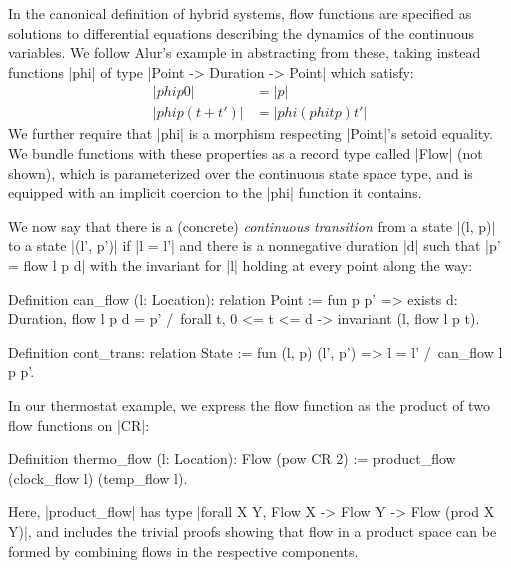 \documentclass[runningheads]{llncs}
\begin{document}

In the canonical definition of hybrid systems, flow functions are specified as solutions to differential equations describing the dynamics of the continuous variables. We follow Alur's example in abstracting from these, taking instead functions |phi| of type |Point -> Duration -> Point| which satisfy:
\begin{align*}
  |phi p 0| &= |p| \\
  |phi p (t + t')| &= |phi (phi t p) t'|
\end{align*}
We further require that |phi| is a morphism respecting |Point|'s setoid equality. We bundle functions with these properties as a record type called |Flow| (not shown), which is parameterized over the continuous state space type, and is equipped with an implicit coercion to the |phi| function it contains.


We now say that there is a (concrete) \emph{continuous transition} from a state |(l, p)| to a state |(l', p')| if |l = l'| and there is a nonnegative duration |d| such that |p' = flow l p d| with the invariant for |l| holding at every point along the way:

\begin{code}
  Definition can_flow (l: Location): relation Point
    := fun p p' => exists d: Duration, flow l p d = p' /\
      forall t, 0 <= t <= d -> invariant (l, flow l p t).

  Definition cont_trans: relation State
    := fun (l, p) (l', p') => l = l' /\ can_flow l p p'.
\end{code}

In our thermostat example, we express the flow function as the product of two flow functions on |CR|:

\begin{code}
  Definition thermo_flow (l: Location): Flow (pow CR 2)
    := product_flow (clock_flow l) (temp_flow l).
\end{code}
Here, |product_flow| has type |forall X Y, Flow X -> Flow Y -> Flow (prod X Y)|, and includes the trivial proofs showing that flow in a product space can be formed by combining flows in the respective components.
\end{document}
